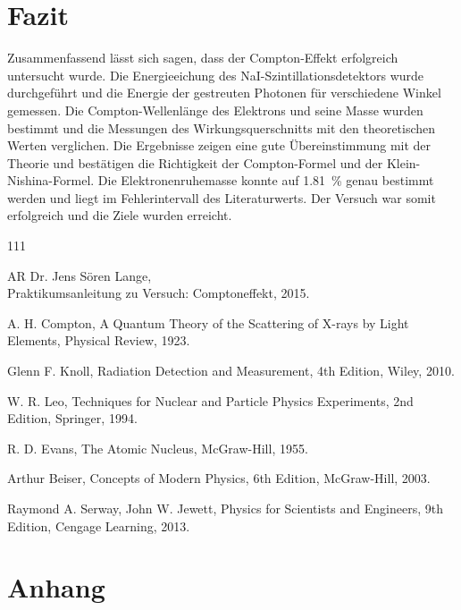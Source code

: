 \documentclass[12pt,a4paper,ngerman]{report}
\begin{document}
    \chapter{Fazit}
			Zusammenfassend lässt sich sagen, dass der Compton-Effekt erfolgreich untersucht wurde. Die Energieeichung des NaI-Szintillationsdetektors wurde durchgeführt und die Energie der gestreuten Photonen für verschiedene Winkel gemessen. Die Compton-Wellenlänge des Elektrons und seine Masse wurden bestimmt und die Messungen des Wirkungsquerschnitts mit den theoretischen Werten verglichen. Die Ergebnisse zeigen eine gute Übereinstimmung mit der Theorie und bestätigen die Richtigkeit der Compton-Formel und der Klein-Nishina-Formel. Die {Elektronenruhemasse} konnte auf {\qty{1,81}{\percent}} genau bestimmt werden und liegt im Fehlerintervall des Literaturwerts. Der Versuch war somit erfolgreich und die Ziele wurden erreicht.


	\listoffigures

	\begin{thebibliography}{111} 
		AR Dr. Jens Sören Lange,\\
		\glqq Praktikumsanleitung zu \glq Versuch: Comptoneffekt\grq \grqq{}, 2015.

		A. H. Compton, \glqq A Quantum Theory of the Scattering of X-rays by Light Elements\grqq{}, Physical Review, 1923.
	
		Glenn F. Knoll, \glqq Radiation Detection and Measurement\grqq{}, 4th Edition, Wiley, 2010.
	
		W. R. Leo, \glqq Techniques for Nuclear and Particle Physics Experiments\grqq{}, 2nd Edition, Springer, 1994.
	
		R. D. Evans, \glqq The Atomic Nucleus\grqq{}, McGraw-Hill, 1955.
	
		Arthur Beiser, \glqq Concepts of Modern Physics\grqq{}, 6th Edition, McGraw-Hill, 2003.
	
		Raymond A. Serway, John W. Jewett, \glqq Physics for Scientists and Engineers\grqq{}, 9th Edition, Cengage Learning, 2013.


	\end{thebibliography}


	\chapter*{Anhang} \label{ch:Anhang}
    \FloatBarrier
\end{document}
